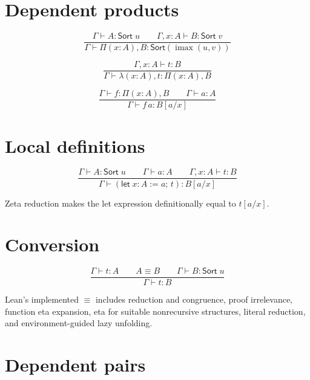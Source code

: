 \documentclass[10pt,letterpaper,oneside,openany]{report}
\newcommand{\defeq}{\mathrel{\equiv}}
\begin{document}
\section{Dependent products}

\begin{formalbox}[$\Pi$ formation]
\[
\frac{\Gamma\vdash A:\mathsf{Sort}\;u
      \qquad
      \Gamma,x:A\vdash B:\mathsf{Sort}\;v}
     {\Gamma\vdash \Pi(x:A),B:\mathsf{Sort}(\operatorname{imax}(u,v))}
\]
\end{formalbox}

\begin{formalbox}[Lambda]
\[
\frac{\Gamma,x:A\vdash t:B}
     {\Gamma\vdash \lambda(x:A),t : \Pi(x:A),B}
\]
\end{formalbox}

\begin{formalbox}[Application]
\[
\frac{\Gamma\vdash f:\Pi(x:A),B
      \qquad
      \Gamma\vdash a:A}
     {\Gamma\vdash f\,a:B[a/x]}
\]
\end{formalbox}

\section{Local definitions}

\begin{formalbox}[Let]
\[
\frac{\Gamma\vdash A:\mathsf{Sort}\;u
      \qquad
      \Gamma\vdash a:A
      \qquad
      \Gamma,x:A\vdash t:B}
     {\Gamma\vdash (\mathsf{let}\;x:A:=a;\,t):B[a/x]}
\]
\end{formalbox}

Zeta reduction makes the let expression definitionally equal to $t[a/x]$.

\section{Conversion}

\begin{formalbox}
\[
\frac{\Gamma\vdash t:A
      \qquad A\defeq B
      \qquad \Gamma\vdash B:\mathsf{Sort}\;u}
     {\Gamma\vdash t:B}
\]
\end{formalbox}

Lean's implemented $\defeq$ includes reduction and congruence, proof irrelevance, function eta expansion, eta for suitable nonrecursive structures, literal reduction, and environment-guided lazy unfolding.

\section{Dependent pairs}
\end{document}
